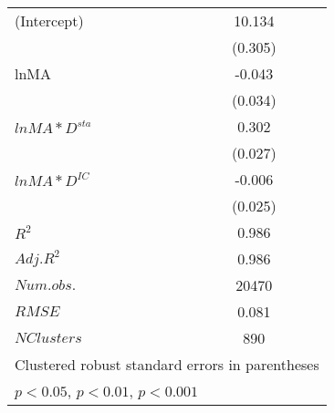 \begin{table}[H]
\begin{minipage}[t]{0.45\columnwidth}
\begin{center}
{\begin{tabular}{l*{4}{c}}
\hline
(Intercept)    &       &      &       10.134\sym{***}&       \\
               &       &      &        (0.305)       &        \\
[1em]
 lnMA            &      &       &      -0.043\sym{} &          \\
               &      &       &     (0.034)         &           \\
[1em]
\(lnMA*D^{sta}\)     &      &      &      0.302\sym{***} &          \\
               &      &       &     (0.027)         &           \\
[1em]
\(lnMA*D^{IC}\)      &       &      &      -0.006\sym{}   &          \\
                 &       &      &     (0.025)         &           \\
  [1em]
\hline
\(R^{2}\)      &      &       &        0.986        &          \\
\(Adj.R^{2}\)  &      &       &       0.986         &         \\
\(Num.obs.\)   &      &       &    20470            &          \\
\(RMSE\)       &      &       &    0.081            &          \\
\(N Clusters\) &      &       &    890              &          \\
\hline\hline
\multicolumn{5}{l}{\footnotesize Clustered robust standard errors in parentheses}\\
\multicolumn{5}{l}{\footnotesize \sym{*} \(p<0.05\), \sym{**} \(p<0.01\), \sym{***} \(p<0.001\)}\\
\end{tabular}
}
  \end{center}
  \end{minipage}
  \end{table}
  

